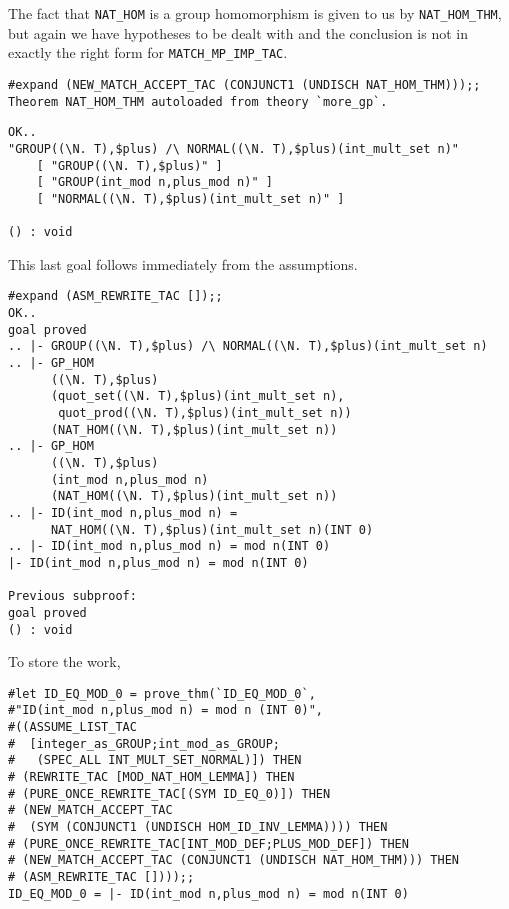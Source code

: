 The fact that {\small\verb+NAT_HOM+} is a group homomorphism is given to us
by {\small\verb+NAT_HOM_THM+}, but again we have hypotheses to be dealt with
and the conclusion is not in exactly the right form for
{\small\verb+MATCH_MP_IMP_TAC+}.
\begin{session}
\begin{verbatim}
#expand (NEW_MATCH_ACCEPT_TAC (CONJUNCT1 (UNDISCH NAT_HOM_THM)));;
Theorem NAT_HOM_THM autoloaded from theory `more_gp`.
\end{verbatim}
\mvdots
\begin{verbatim}
OK..
"GROUP((\N. T),$plus) /\ NORMAL((\N. T),$plus)(int_mult_set n)"
    [ "GROUP((\N. T),$plus)" ]
    [ "GROUP(int_mod n,plus_mod n)" ]
    [ "NORMAL((\N. T),$plus)(int_mult_set n)" ]

() : void
\end{verbatim}
\end{session}

This last goal follows immediately from the assumptions.
\begin{session}
\begin{verbatim}
#expand (ASM_REWRITE_TAC []);;
OK..
goal proved
.. |- GROUP((\N. T),$plus) /\ NORMAL((\N. T),$plus)(int_mult_set n)
.. |- GP_HOM
      ((\N. T),$plus)
      (quot_set((\N. T),$plus)(int_mult_set n),
       quot_prod((\N. T),$plus)(int_mult_set n))
      (NAT_HOM((\N. T),$plus)(int_mult_set n))
.. |- GP_HOM
      ((\N. T),$plus)
      (int_mod n,plus_mod n)
      (NAT_HOM((\N. T),$plus)(int_mult_set n))
.. |- ID(int_mod n,plus_mod n) =
      NAT_HOM((\N. T),$plus)(int_mult_set n)(INT 0)
.. |- ID(int_mod n,plus_mod n) = mod n(INT 0)
|- ID(int_mod n,plus_mod n) = mod n(INT 0)

Previous subproof:
goal proved
() : void
\end{verbatim}
\end{session}

To store the work,
\begin{session}
\begin{verbatim}
#let ID_EQ_MOD_0 = prove_thm(`ID_EQ_MOD_0`,
#"ID(int_mod n,plus_mod n) = mod n (INT 0)",
#((ASSUME_LIST_TAC
#  [integer_as_GROUP;int_mod_as_GROUP;
#   (SPEC_ALL INT_MULT_SET_NORMAL)]) THEN
# (REWRITE_TAC [MOD_NAT_HOM_LEMMA]) THEN
# (PURE_ONCE_REWRITE_TAC[(SYM ID_EQ_0)]) THEN
# (NEW_MATCH_ACCEPT_TAC
#  (SYM (CONJUNCT1 (UNDISCH HOM_ID_INV_LEMMA)))) THEN
# (PURE_ONCE_REWRITE_TAC[INT_MOD_DEF;PLUS_MOD_DEF]) THEN
# (NEW_MATCH_ACCEPT_TAC (CONJUNCT1 (UNDISCH NAT_HOM_THM))) THEN
# (ASM_REWRITE_TAC [])));;
ID_EQ_MOD_0 = |- ID(int_mod n,plus_mod n) = mod n(INT 0)
\end{verbatim}
\end{session}


